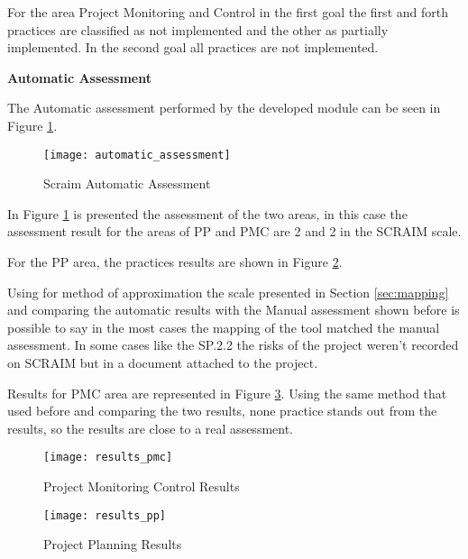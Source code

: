 For the area Project Monitoring and Control in the first goal the first and forth practices are classified as not implemented and the other as partially implemented. In the second goal all practices are not implemented.

\textbf{Automatic Assessment}

The Automatic assessment performed by the developed module can be seen in Figure \ref{fig:automatic_assessment}.

\begin{figure}[!htb]
	\begin{center}
		\leavevmode
		\texttt{[image: automatic\_assessment]}
		\caption{Scraim Automatic Assessment}
		\label{fig:automatic_assessment}
	\end{center}
\end{figure}

In Figure \ref{fig:automatic_assessment} is presented the assessment of the two areas, in this case the assessment result for the areas of PP and PMC are 2 and 2 in the SCRAIM scale.

For the PP area, the practices results are shown in Figure \ref{fig:results_pp}.

Using for method of approximation the scale presented in Section \ref{sec:mapping} and comparing the automatic results with the Manual assessment shown before is possible to say in the most cases the mapping of the tool matched the manual assessment. In some cases like  the SP.2.2 the risks of the project weren't recorded on SCRAIM but in a document attached to the project.


Results for PMC area are represented in Figure \ref{fig:results_pmc}. Using the same method that used before and comparing the two results, none practice stands out from the results, so the results are close to a real assessment.


\begin{figure}[!htb]
	\begin{center}
		\leavevmode
		\texttt{[image: results\_pmc]}
		\caption{Project Monitoring Control Results}
		\label{fig:results_pp}
	\end{center}
\end{figure}

\begin{figure}[!htb]
	\begin{center}
		\leavevmode
		\texttt{[image: results\_pp]}
		\caption{Project Planning Results}
		\label{fig:results_pmc}
	\end{center}
\end{figure}